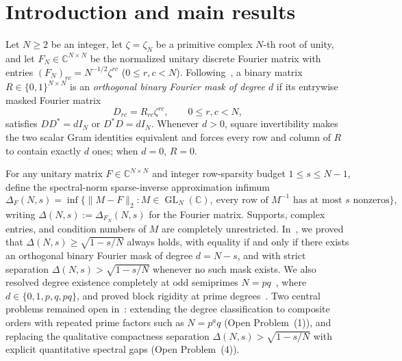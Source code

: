 \documentclass[11pt,reqno]{amsart}
\numberwithin{equation}{section}
\theoremstyle{definition}
\theoremstyle{remark}
\newcommand{\C}{\mathbb{C}}
\newcommand{\GL}{\operatorname{GL}}
\begin{document}
\maketitle

\section{Introduction and main results}
\label{sec:intro}

Let $N\ge 2$ be an integer, let $\zeta=\zeta_N$ be a primitive complex $N$-th root of unity, and let $F_N\in\C^{N\times N}$ be the normalized unitary discrete Fourier matrix with entries $(F_N)_{rc}=N^{-1/2}\zeta^{rc}$ ($0\le r,c<N$). Following~\cite{KKKKK26}, a binary matrix $R\in\{0,1\}^{N\times N}$ is an \emph{orthogonal binary Fourier mask of degree $d$} if its entrywise masked Fourier matrix
\begin{equation}
\label{eq:mask-def}
D_{rc} = R_{rc}\zeta^{rc},\qquad 0\le r,c<N,
\end{equation}
satisfies $DD^*=dI_N$ or $D^*D=dI_N$. Whenever $d>0$, square invertibility makes the two scalar Gram identities equivalent and forces every row and column of $R$ to contain exactly $d$ ones; when $d=0$, $R=0$.

For any unitary matrix $F\in\C^{N\times N}$ and integer row-sparsity budget $1\le s\le N-1$, define the spectral-norm sparse-inverse approximation infimum
\begin{equation}
\label{eq:delta-def}
\Delta_F(N,s) = \inf\bigl\{\|M - F\|_2 : M\in\GL_N(\C),\ \text{every row of } M^{-1}\text{ has at most }s\text{ nonzeros}\bigr\},
\end{equation}
writing $\Delta(N,s):=\Delta_{F_N}(N,s)$ for the Fourier matrix. Supports, complex entries, and condition numbers of $M$ are completely unrestricted. In~\cite[Theorem~1.1]{KKKKK26}, we proved that $\Delta(N,s)\ge\sqrt{1-s/N}$ always holds, with equality if and only if there exists an orthogonal binary Fourier mask of degree $d=N-s$, and with strict separation $\Delta(N,s)>\sqrt{1-s/N}$ whenever no such mask exists. We also resolved degree existence completely at odd semiprimes $N=pq$~\cite[Theorem~1.2]{KKKKK26}, where $d\in\{0,1,p,q,pq\}$, and proved block rigidity at prime degrees~\cite[Theorems~1.3--1.5]{KKKKK26}. Two central problems remained open in~\cite[Section~6.1]{KKKKK26}: extending the degree classification to composite orders with repeated prime factors such as $N=p^a q$ (Open Problem~(1)), and replacing the qualitative compactness separation $\Delta(N,s)>\sqrt{1-s/N}$ with explicit quantitative spectral gaps (Open Problem~(4)).
\end{document}
